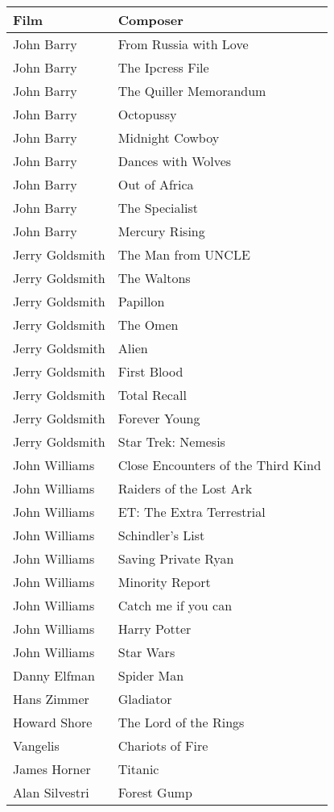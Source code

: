 \begin{table}[H]
\begin{tabular}{|p{5.0cm}|p{8.0cm}|}
\hline
Film & Composer \\\hline
John Barry &  From Russia with Love   \\\hline
John Barry &  The Ipcress File  \\\hline
John Barry &  The Quiller Memorandum   \\\hline
John Barry &  Octopussy   \\\hline
John Barry &  Midnight Cowboy   \\\hline
John Barry &  Dances with Wolves   \\\hline
John Barry &  Out of Africa   \\\hline
John Barry &  The Specialist   \\\hline
John Barry &  Mercury Rising   \\\hline
Jerry Goldsmith &  The Man from UNCLE   \\\hline
Jerry Goldsmith &  The Waltons   \\\hline
Jerry Goldsmith &  Papillon   \\\hline
Jerry Goldsmith &  The Omen   \\\hline
Jerry Goldsmith &  Alien   \\\hline
Jerry Goldsmith &  First Blood   \\\hline
Jerry Goldsmith &  Total Recall   \\\hline
Jerry Goldsmith &  Forever Young   \\\hline
Jerry Goldsmith &  Star Trek: Nemesis   \\\hline
John Williams & Close Encounters of the Third Kind    \\\hline
John Williams & Raiders of the Lost Ark    \\\hline
John Williams & ET: The Extra Terrestrial    \\\hline
John Williams & Schindler's List    \\\hline
John Williams & Saving Private Ryan    \\\hline
John Williams & Minority Report    \\\hline
John Williams & Catch me if you can    \\\hline
John Williams & Harry Potter    \\\hline
John Williams & Star Wars    \\\hline
Danny Elfman & Spider Man    \\\hline
Hans Zimmer &  Gladiator   \\\hline
Howard Shore &  The Lord of the Rings   \\\hline
Vangelis &  Chariots of Fire   \\\hline
James Horner & Titanic    \\\hline
Alan Silvestri & Forest Gump    \\\hline

\end{tabular}
\label{tab:composersandfilms}
\end{table}

